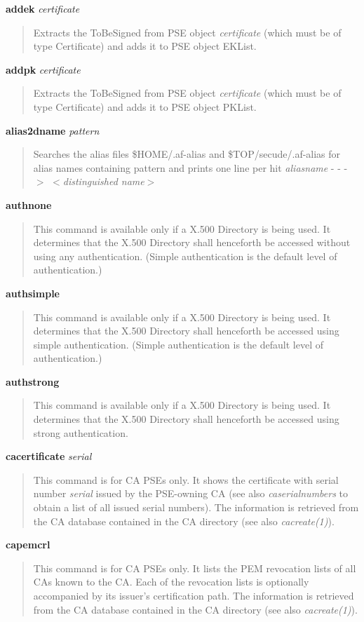 {\bf addek} {\em certificate}
\begin{quote}
Extracts the ToBeSigned from PSE object {\em certificate} (which must be of type Certificate)
and adds it to PSE object EKList.
\end{quote}

{\bf addpk} {\em certificate}
\begin{quote}
Extracts the ToBeSigned from PSE object {\em certificate} (which must be of type Certificate)
and adds it to PSE object PKList.
\end{quote}

{\bf alias2dname} {\em pattern}
\begin{quote}
Searches the alias files \$HOME/.af-alias and \$TOP/secude/.af-alias for alias names
containing pattern and prints one line per hit
\bc
{\em aliasname} - - -$>$ $<${\em distinguished name}$>$
\ec
\end{quote}

{\bf authnone}
\begin{quote}
This command is available only if a X.500 Directory is being used.
It determines that the X.500 Directory shall henceforth be accessed without using any authentication.
(Simple authentication is the default level of authentication.) 
\end{quote}

{\bf authsimple}
\begin{quote}
This command is available only if a X.500 Directory is being used.
It determines that the X.500 Directory shall henceforth be accessed using simple authentication.
(Simple authentication is the default level of authentication.) 
\end{quote}

{\bf authstrong}
\begin{quote}
This command is available only if a X.500 Directory is being used.
It determines that the X.500 Directory shall henceforth be accessed using strong authentication. 
\end{quote}


{\bf cacertificate} {\em serial}
\begin{quote}
This command is for CA PSEs only.
It shows the certificate with serial number {\em serial} issued by the PSE-owning CA (see also
{\em caserialnumbers} to obtain a list of all issued serial numbers). The
information is retrieved from the CA database contained in the CA directory (see also {\em cacreate(1)}).
\end{quote}

{\bf capemcrl}
\begin{quote}
This command is for CA PSEs only.
It lists the PEM revocation lists of all CAs known to the CA. Each of the revocation lists is optionally
accompanied by its issuer's certification path. 
The information is retrieved from the CA database contained in the CA directory (see also {\em 
cacreate(1)}).
\end{quote}

